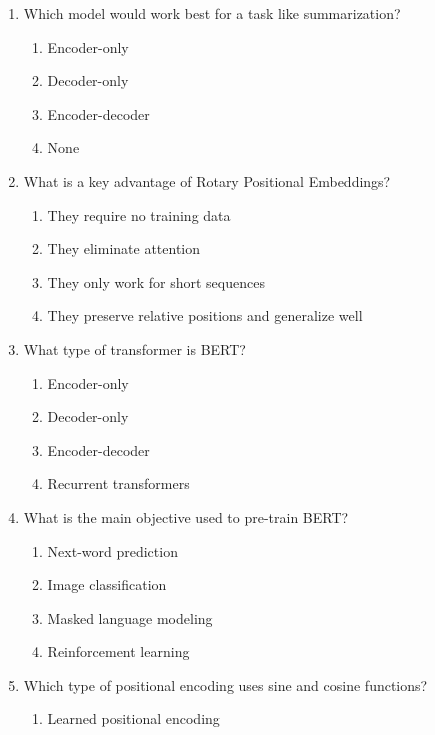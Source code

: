 \documentclass[12pt]{article}
\begin{document}
\begin{enumerate}[label=Q\arabic*.]
\begin{enumerate}[label=(\Alph*)]
    \item They rely on recurrence
    \item They use self-attention instead of recurrence
    \item They cannot handle sequences
\end{enumerate}
\item Which model would work best for a task like summarization?
\begin{enumerate}[label=(\Alph*)]
    \item Encoder-only
    \item Decoder-only
    \item Encoder-decoder
    \item None
\end{enumerate}
\item What is a key advantage of Rotary Positional Embeddings?
\begin{enumerate}[label=(\Alph*)]
    \item They require no training data
    \item They eliminate attention
    \item They only work for short sequences
    \item They preserve relative positions and generalize well
\end{enumerate}
\item What type of transformer is BERT?
\begin{enumerate}[label=(\Alph*)]
    \item Encoder-only
    \item Decoder-only
    \item Encoder-decoder
    \item Recurrent transformers
\end{enumerate}
\item What is the main objective used to pre-train BERT?
\begin{enumerate}[label=(\Alph*)]
    \item Next-word prediction
    \item Image classification
    \item Masked language modeling
    \item Reinforcement learning
\end{enumerate}
\item Which type of positional encoding uses sine and cosine functions?
\begin{enumerate}[label=(\Alph*)]
    \item Learned positional encoding

\end{enumerate}
\end{enumerate}
\end{document}
